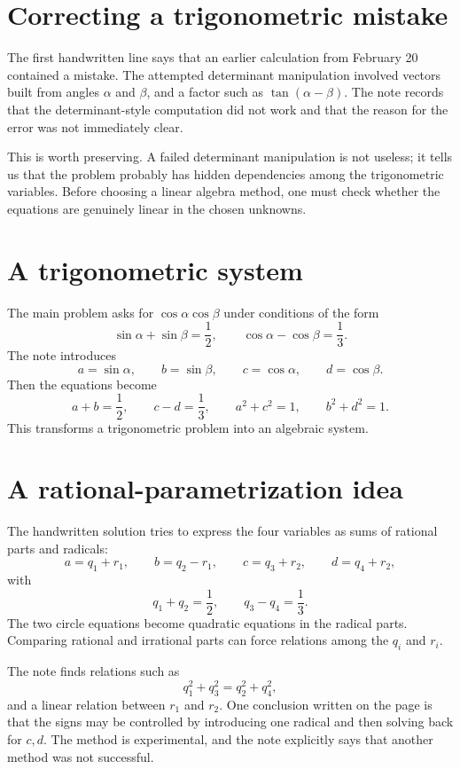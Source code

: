 
\section{Correcting a trigonometric mistake}

The first handwritten line says that an earlier calculation from February 20 contained a mistake.  The attempted determinant manipulation involved vectors built from angles $\alpha$ and $\beta$, and a factor such as $\tan(\alpha-\beta)$.  The note records that the determinant-style computation did not work and that the reason for the error was not immediately clear.

This is worth preserving.  A failed determinant manipulation is not useless; it tells us that the problem probably has hidden dependencies among the trigonometric variables.  Before choosing a linear algebra method, one must check whether the equations are genuinely linear in the chosen unknowns.

\section{A trigonometric system}

The main problem asks for $\cos\alpha\cos\beta$ under conditions of the form
\[
  \sin\alpha+\sin\beta=\frac12,
  \qquad
  \cos\alpha-\cos\beta=\frac13.
\]
The note introduces
\[
  a=\sin\alpha,\qquad b=\sin\beta,\qquad
  c=\cos\alpha,\qquad d=\cos\beta.
\]
Then the equations become
\[
  a+b=\frac12,\qquad c-d=\frac13,\qquad
  a^2+c^2=1,\qquad b^2+d^2=1.
\]
This transforms a trigonometric problem into an algebraic system.

\section{A rational-parametrization idea}

The handwritten solution tries to express the four variables as sums of rational parts and radicals:
\[
  a=q_1+r_1,\qquad b=q_2-r_1,\qquad
  c=q_3+r_2,\qquad d=q_4+r_2,
\]
with
\[
  q_1+q_2=\frac12,\qquad q_3-q_4=\frac13.
\]
The two circle equations become quadratic equations in the radical parts.  Comparing rational and irrational parts can force relations among the $q_i$ and $r_i$.

The note finds relations such as
\[
  q_1^2+q_3^2=q_2^2+q_4^2,
\]
and a linear relation between $r_1$ and $r_2$.  One conclusion written on the page is that the signs may be controlled by introducing one radical and then solving back for $c,d$.  The method is experimental, and the note explicitly says that another method was not successful.

